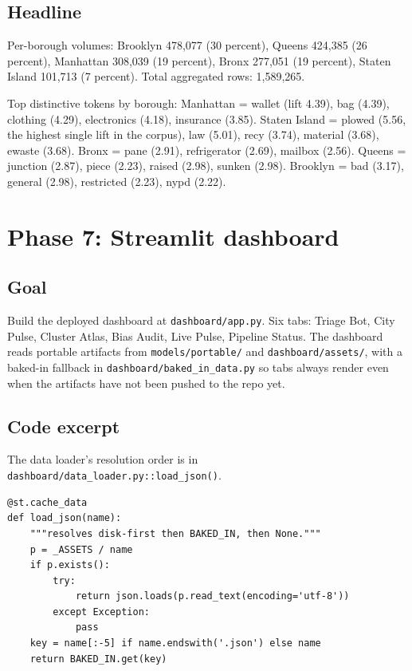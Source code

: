 \documentclass[11pt,letterpaper]{book}
\begin{document}
\subsection*{Headline}

Per-borough volumes: Brooklyn 478,077 (30 percent), Queens 424,385 (26 percent), Manhattan 308,039 (19 percent), Bronx 277,051 (19 percent), Staten Island 101,713 (7 percent). Total aggregated rows: 1,589,265.

Top distinctive tokens by borough: Manhattan = wallet (lift 4.39), bag (4.39), clothing (4.29), electronics (4.18), insurance (3.85). Staten Island = plowed (5.56, the highest single lift in the corpus), law (5.01), recy (3.74), material (3.68), ewaste (3.68). Bronx = pane (2.91), refrigerator (2.69), mailbox (2.56). Queens = junction (2.87), piece (2.23), raised (2.98), sunken (2.98). Brooklyn = bad (3.17), general (2.98), restricted (2.23), nypd (2.22).

\section{Phase 7: Streamlit dashboard}
\label{sec:phase7}

\subsection*{Goal}

Build the deployed dashboard at \texttt{dashboard/app.py}. Six tabs: Triage Bot, City Pulse, Cluster Atlas, Bias Audit, Live Pulse, Pipeline Status. The dashboard reads portable artifacts from \texttt{models/portable/} and \texttt{dashboard/assets/}, with a baked-in fallback in \texttt{dashboard/baked\_in\_data.py} so tabs always render even when the artifacts have not been pushed to the repo yet.

\subsection*{Code excerpt}

The data loader's resolution order is in \texttt{dashboard/data\_loader.py::load\_json()}.

\begin{lstlisting}
@st.cache_data
def load_json(name):
    """resolves disk-first then BAKED_IN, then None."""
    p = _ASSETS / name
    if p.exists():
        try:
            return json.loads(p.read_text(encoding='utf-8'))
        except Exception:
            pass
    key = name[:-5] if name.endswith('.json') else name
    return BAKED_IN.get(key)
\end{lstlisting}
\end{document}
